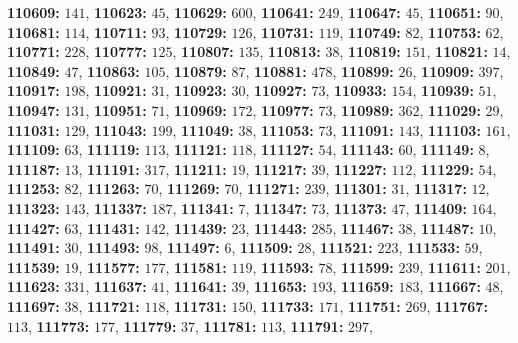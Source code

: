 \textsf{\bfseries 110609:} $141$, \textsf{\bfseries 110623:} $45$, \textsf{\bfseries 110629:} $600$, \textsf{\bfseries 110641:} $249$, \textsf{\bfseries 110647:} $45$, \textsf{\bfseries 110651:} $90$, \textsf{\bfseries 110681:} $114$, \textsf{\bfseries 110711:} $93$, \textsf{\bfseries 110729:} $126$, \textsf{\bfseries 110731:} $119$, \textsf{\bfseries 110749:} $82$, \textsf{\bfseries 110753:} $62$, \textsf{\bfseries 110771:} $228$, \textsf{\bfseries 110777:} $125$, \textsf{\bfseries 110807:} $135$, \textsf{\bfseries 110813:} $38$, \textsf{\bfseries 110819:} $151$, \textsf{\bfseries 110821:} $14$, \textsf{\bfseries 110849:} $47$, \textsf{\bfseries 110863:} $105$, \textsf{\bfseries 110879:} $87$, \textsf{\bfseries 110881:} $478$, \textsf{\bfseries 110899:} $26$, \textsf{\bfseries 110909:} $397$, \textsf{\bfseries 110917:} $198$, \textsf{\bfseries 110921:} $31$, \textsf{\bfseries 110923:} $30$, \textsf{\bfseries 110927:} $73$, \textsf{\bfseries 110933:} $154$, \textsf{\bfseries 110939:} $51$, \textsf{\bfseries 110947:} $131$, \textsf{\bfseries 110951:} $71$, \textsf{\bfseries 110969:} $172$, \textsf{\bfseries 110977:} $73$, \textsf{\bfseries 110989:} $362$, \textsf{\bfseries 111029:} $29$, \textsf{\bfseries 111031:} $129$, \textsf{\bfseries 111043:} $199$, \textsf{\bfseries 111049:} $38$, \textsf{\bfseries 111053:} $73$, \textsf{\bfseries 111091:} $143$, \textsf{\bfseries 111103:} $161$, \textsf{\bfseries 111109:} $63$, \textsf{\bfseries 111119:} $113$, \textsf{\bfseries 111121:} $118$, \textsf{\bfseries 111127:} $54$, \textsf{\bfseries 111143:} $60$, \textsf{\bfseries 111149:} $8$, \textsf{\bfseries 111187:} $13$, \textsf{\bfseries 111191:} $317$, \textsf{\bfseries 111211:} $19$, \textsf{\bfseries 111217:} $39$, \textsf{\bfseries 111227:} $112$, \textsf{\bfseries 111229:} $54$, \textsf{\bfseries 111253:} $82$, \textsf{\bfseries 111263:} $70$, \textsf{\bfseries 111269:} $70$, \textsf{\bfseries 111271:} $239$, \textsf{\bfseries 111301:} $31$, \textsf{\bfseries 111317:} $12$, \textsf{\bfseries 111323:} $143$, \textsf{\bfseries 111337:} $187$, \textsf{\bfseries 111341:} $7$, \textsf{\bfseries 111347:} $73$, \textsf{\bfseries 111373:} $47$, \textsf{\bfseries 111409:} $164$, \textsf{\bfseries 111427:} $63$, \textsf{\bfseries 111431:} $142$, \textsf{\bfseries 111439:} $23$, \textsf{\bfseries 111443:} $285$, \textsf{\bfseries 111467:} $38$, \textsf{\bfseries 111487:} $10$, \textsf{\bfseries 111491:} $30$, \textsf{\bfseries 111493:} $98$, \textsf{\bfseries 111497:} $6$, \textsf{\bfseries 111509:} $28$, \textsf{\bfseries 111521:} $223$, \textsf{\bfseries 111533:} $59$, \textsf{\bfseries 111539:} $19$, \textsf{\bfseries 111577:} $177$, \textsf{\bfseries 111581:} $119$, \textsf{\bfseries 111593:} $78$, \textsf{\bfseries 111599:} $239$, \textsf{\bfseries 111611:} $201$, \textsf{\bfseries 111623:} $331$, \textsf{\bfseries 111637:} $41$, \textsf{\bfseries 111641:} $39$, \textsf{\bfseries 111653:} $193$, \textsf{\bfseries 111659:} $183$, \textsf{\bfseries 111667:} $48$, \textsf{\bfseries 111697:} $38$, \textsf{\bfseries 111721:} $118$, \textsf{\bfseries 111731:} $150$, \textsf{\bfseries 111733:} $171$, \textsf{\bfseries 111751:} $269$, \textsf{\bfseries 111767:} $113$, \textsf{\bfseries 111773:} $177$, \textsf{\bfseries 111779:} $37$, \textsf{\bfseries 111781:} $113$, \textsf{\bfseries 111791:} $297$, 
